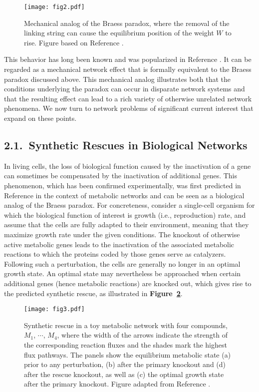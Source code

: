 \documentclass[
preprint,
superscriptaddress,
aps,
prl,
]{revtex4-1}
\begin{document}
\begin{figure}[h]
\texttt{[image: fig2.pdf]}
\caption{Mechanical analog of the Braess paradox, where the removal of the linking string can cause the equilibrium position 
of the weight $W$ to rise. Figure based on Reference \cite{cohen1991paradoxical}.
}
\label{fig2}
\end{figure}

This behavior has long been known and was popularized in Reference \cite{cohen1991paradoxical}. It can be regarded as a mechanical network effect that is formally equivalent to the Braess paradox  discussed above. This mechanical analog illustrates both that the conditions underlying the paradox can occur in disparate network systems and that the resulting effect can lead to a rich variety of otherwise unrelated network phenomena. We now turn to network problems of significant current interest that expand on these points.


\subsection{2.1.~Synthetic Rescues in Biological Networks} 


In living cells, the loss of biological function caused by the inactivation of a gene can sometimes be compensated by the inactivation of additional genes. 
This phenomenon, which has been confirmed experimentally,  was first predicted  in  Reference \cite{motter2008predicting}  in the context of metabolic networks and can be seen as a biological analog of the Braess paradox. For concreteness, consider a single-cell organism for which the biological function of interest is growth (i.e., reproduction) rate, and assume that the cells are fully adapted to their environment, meaning that they maximize growth rate under the given conditions. The knockout of otherwise active metabolic genes leads to the inactivation of the associated metabolic reactions to which the proteins coded by those genes serve as catalyzers. Following such a perturbation, the cells are generally no longer in an optimal growth state. An optimal  state may nevertheless be approached when certain additional genes (hence metabolic reactions) are knocked out, which gives rise to the predicted synthetic rescue, as illustrated in  \textbf{Figure~\ref{fig3}}.

\begin{figure}[t]
\texttt{[image: fig3.pdf]}
\caption{Synthetic rescue in a toy metabolic network with four  compounds, $M_1$, $\cdots$, $M_4$, where the width of the arrows 
indicate the strength of the corresponding reaction fluxes  and the shades mark the highest flux pathways.
The panels show the equilibrium metabolic state (a) prior to any perturbation, (b) after 
the primary knockout and
(d) after the rescue knockout, as well as (c)  the optimal growth state after the primary knockout.
Figure adapted from Reference \cite{motter2008predicting}.
}
\label{fig3}
\end{figure}
\end{document}
